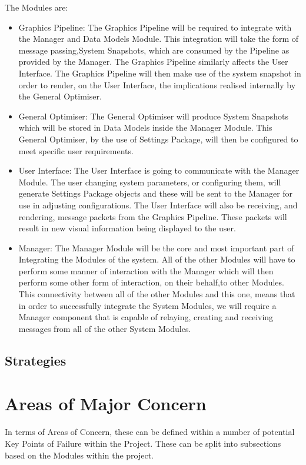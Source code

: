 \documentclass[11pt]{article}
\begin{document}
The Modules are:
\begin{itemize}
\item Graphics Pipeline: The Graphics Pipeline will be required to integrate with the Manager and Data Models Module. This integration will take the form of message passing,System Snapshots, which are consumed by the Pipeline as provided by the Manager. The Graphics Pipeline similarly affects the User Interface. The Graphics Pipeline will then make use of the system snapshot in order to render, on the User Interface, the implications realised internally by the General Optimiser.
\item General Optimiser: The General Optimiser will produce System Snapshots which will be stored in Data Models inside the Manager Module. This General Optimiser, by the use of Settings Package, will then be configured to meet specific user requirements. 
\item User Interface: The User Interface is going to communicate with the Manager Module. The user changing system parameters, or configuring them, will generate Settings Package objects and these will be sent to the Manager for use in adjusting configurations. The User Interface will also be receiving, and rendering, message packets from the Graphics Pipeline. These packets will result in new visual information being displayed to the user.
\item Manager: The Manager Module will be the core and most important part of Integrating the Modules of the system. All of the other Modules will have to perform some manner of interaction with the Manager which will then perform some other form of interaction, on their behalf,to other Modules. This connectivity between all of the other Modules and this one, means that in order to successfully integrate the System Modules, we will require a Manager component that is capable of relaying, creating and receiving messages from all of the other System Modules.

\end{itemize}
 
\subsection{Strategies}

\section{Areas of Major Concern}
In terms of Areas of Concern, these can be defined within a number of potential Key Points of Failure within the Project. These can be split into subsections based on the Modules within the project.
\end{document}
